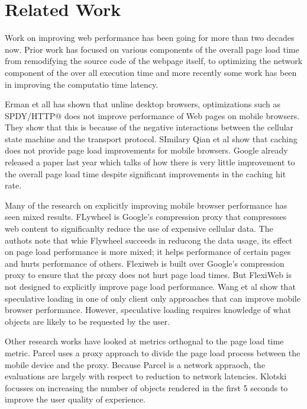 \section{Related Work}
\label{sec:related}

Work on improving web performance has been going for more than two decades now. 
Prior work has focused on various components of the overall page load time
from remodifying the source code of the webpage itself, to optimizing the
network component of the over all execution time and more recently some work
has been in improving the computatio time latency. 

Erman et all \cite{erman2013conext} %
has shown that unline desktop browsers, optimizations such as SPDY/HTTP@ does not improve
performance of Web pages on mobile browsers. They show that this is because of the negative interactions
between the cellular state machine and the transport protocol. SImilary Qian
et al \cite{quian2012mobisys} %
show that caching does not provide
page load improvements for mobile browsers. 
Google already released a paper last year \cite{vesuna2016caching} %
which talks of how there is very little improvement to the overall page load time despite 
significant improvements in the caching hit rate. 

Many of the research on explicitly improving mobile browser performance has seen mixed results.
FLywheel \cite{agababov2015nsdi} is Google's compression proxy that compressses web content to significanlty 
reduce the use of expensive cellular data. The authots note that whie Flywheel succeeds in
reducong the data usage, its effect on page load performance is more mixed; it helps
performance of certain pages and hurts performance of others. Flexiweb \cite{singh2015mobicom} is built over
Google's compression proxy to ensure that the proxy does not hurt page load times. But FlexiWeb
is not designed to explicitly improve page load performance. Wang et al \cite{wang2013demystifying} show that
speculative loading in one of only client only approaches that can improve mobile
browser performance. However, speculative loading requires knowledge of what objects are likely
to be requested by the user. 

Other research works have looked at metrics orthognal to the page load time metric. Parcel
\cite{sivakumar2014conext} %
 uses a proxy
approach to divide the page load process between the mobile device and the proxy. Because Parcel is
a network appraoch, the evaluations are largely with respect to reduction to network
latencies. Klotski \cite{butkiewicz2015usenix} focusses on increasing the number of objects rendered in the first
5 seconds to improve the user quality of experience. 

